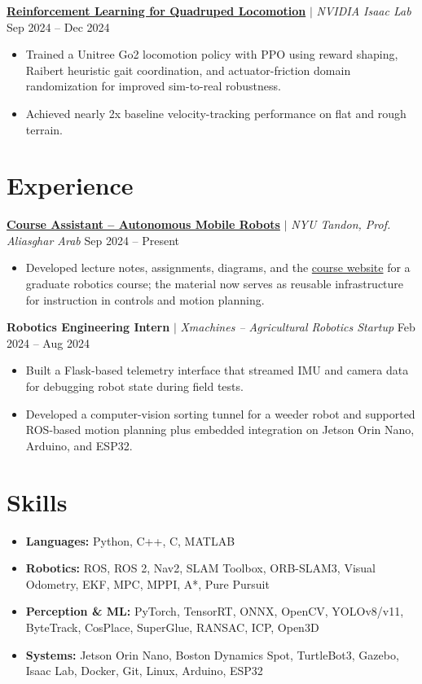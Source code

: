 \documentclass[10pt,letterpaper]{article}
\begin{document}
\href{https://github.com/Nishant-ZFYII/rob6323_go2_project}{\textbf{Reinforcement Learning for Quadruped Locomotion}} $|$ \textit{NVIDIA Isaac Lab} \hfill Sep 2024 -- Dec 2024
\begin{itemize}
    \item Trained a Unitree Go2 locomotion policy with PPO using reward shaping, Raibert heuristic gait coordination, and actuator-friction domain randomization for improved sim-to-real robustness.
    \item Achieved nearly 2x baseline velocity-tracking performance on flat and rough terrain.
\end{itemize}

\section{Experience}

\href{https://wp.nyu.edu/aarab/}{\textbf{Course Assistant -- Autonomous Mobile Robots}} $|$ \textit{NYU Tandon, Prof. Aliasghar Arab} \hfill Sep 2024 -- Present
\begin{itemize}
    \item Developed lecture notes, assignments, diagrams, and the \href{https://vivekmattam02.github.io/amr-notes/}{course website} for a graduate robotics course; the material now serves as reusable infrastructure for instruction in controls and motion planning.
\end{itemize}
\vspace{1pt}

\textbf{Robotics Engineering Intern} $|$ \textit{Xmachines -- Agricultural Robotics Startup} \hfill Feb 2024 -- Aug 2024
\begin{itemize}
    \item Built a Flask-based telemetry interface that streamed IMU and camera data for debugging robot state during field tests.
    \item Developed a computer-vision sorting tunnel for a weeder robot and supported ROS-based motion planning plus embedded integration on Jetson Orin Nano, Arduino, and ESP32.
\end{itemize}

\section{Skills}

\begin{itemize}[leftmargin=0in, label={}, itemsep=0pt]
    \item \textbf{Languages:} Python, C++, C, MATLAB
    \item \textbf{Robotics:} ROS, ROS 2, Nav2, SLAM Toolbox, ORB-SLAM3, Visual Odometry, EKF, MPC, MPPI, A*, Pure Pursuit
    \item \textbf{Perception \& ML:} PyTorch, TensorRT, ONNX, OpenCV, YOLOv8/v11, ByteTrack, CosPlace, SuperGlue, RANSAC, ICP, Open3D
    \item \textbf{Systems:} Jetson Orin Nano, Boston Dynamics Spot, TurtleBot3, Gazebo, Isaac Lab, Docker, Git, Linux, Arduino, ESP32
\end{itemize}
\end{document}
